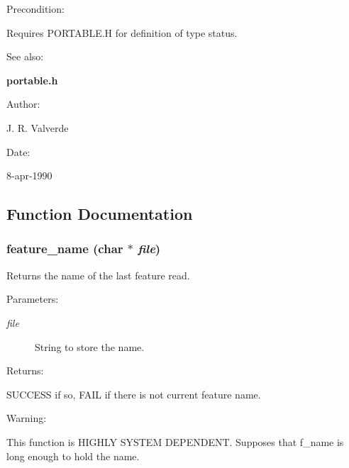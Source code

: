 \begin{Desc}
\item[Precondition: ]\par
Requires PORTABLE.H for definition of type status.\end{Desc}
\begin{Desc}
\item[See also: ]\par
{\bf portable.h}\end{Desc}
\begin{Desc}
\item[Author: ]\par
J. R. Valverde  \end{Desc}
\begin{Desc}
\item[Date: ]\par
8-apr-1990\end{Desc}


\subsection{Function Documentation}
\subsubsection{ feature\_\-name (char $\ast$ {\em file})}\label{P__desc_8h_a2}


Returns the name of the last feature read.



 \begin{Desc}
\item[Parameters: ]\par
\begin{description}
\item[{\em 
file}]String to store the name.\end{description}
\end{Desc}
\begin{Desc}
\item[Returns: ]\par
SUCCESS if so, FAIL if there is not current feature name.\end{Desc}
\begin{Desc}
\item[Warning: ]\par
This function is HIGHLY SYSTEM DEPENDENT. Supposes that f\_\-name is long enough to hold the name. \end{Desc}

